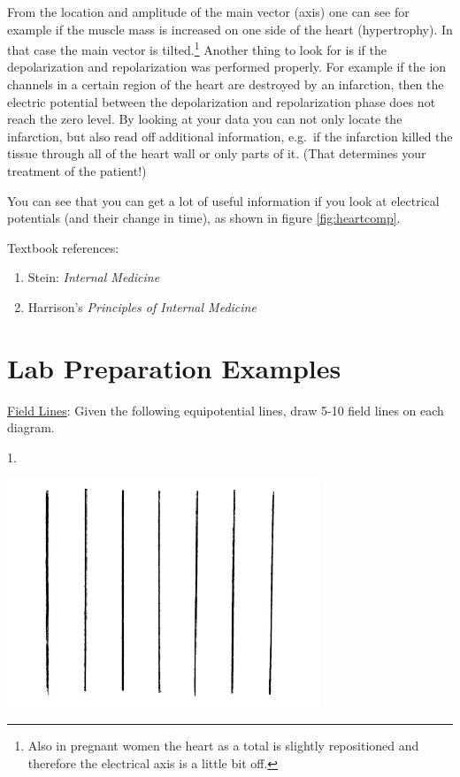 From the location and amplitude of the main vector (axis) one can see for example if the muscle mass is increased on one side of the heart (hypertrophy). In that case the main vector is tilted.\footnote{Also in pregnant women the heart as a total is slightly repositioned and therefore the electrical axis is a little bit off.} Another thing to look for is if the depolarization and repolarization was performed properly. For example if the ion channels in a certain region of the heart are destroyed by an infarction, then the electric potential between the depolarization and repolarization phase does not reach the zero level. By looking at your data you can not only locate the infarction, but also read off additional information, e.g.\ if the infarction killed the tissue through all of the heart wall or only parts of it. (That determines your treatment of the patient!) \myskip

You can see that you can get a lot of useful information if you look at electrical potentials (and their change in time), as shown in figure \ref{fig:heartcomp}. \myskip

Textbook references:
\begin{enumerate}
    \item Stein: \emph{Internal Medicine}
    \item Harrison's \emph{Principles of Internal Medicine}
\end{enumerate}

\newpage
\section{Lab Preparation Examples}

\noindent\underline{Field Lines}: Given the following equipotential lines, draw 5-10 field lines on each diagram. \myskip

\begin{minipage}[h]{0.95\textwidth}
    1.\begin{center}
        \includegraphics[width=0.7\textwidth]{./Exp1/pic/image9.png}
    \end{center}
\end{minipage}

